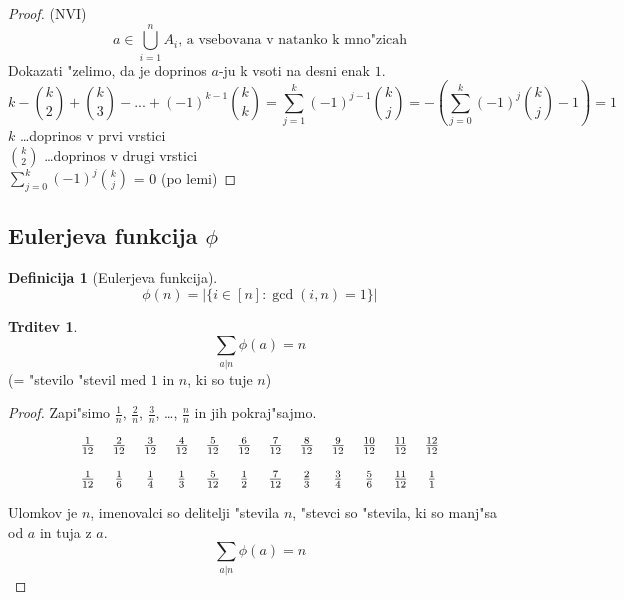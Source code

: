 \documentclass[a4paper,12pt]{article}
\theoremstyle{definition}
\newtheorem{defn}[counter]{Definicija}
\newtheorem{claim}[counter]{Trditev}
\theoremstyle{remark}
\begin{document}
\begin{proof}(NVI)
	\label{TODO: tega ne bom gledu}
	\[a \in \bigcup_{i = 1}^{n} A_i \text{, a vsebovana v natanko k mno"zicah}\]
	Dokazati "zelimo, da je doprinos $a$-ju k vsoti na desni enak $1$.
	\[k - \binom{k}{2} + \binom{k}{3} - ... + (-1)^{k-1} \binom{k}{k} = \sum_{j = 1}^{k} (-1)^{j - 1} \binom{k}{j} = - (\sum_{j = 0}^{k} (-1)^j \binom{k}{j} - 1) = 1\]
	$k$ \ldots doprinos v prvi vrstici\\
	$\binom{k}{2}$ \ldots doprinos v drugi vrstici\\
	$\displaystyle \sum_{j = 0}^{k} (-1)^j \binom{k}{j}$ = 0 (po lemi)
\end{proof}

\subsection{Eulerjeva funkcija $\phi$} %
\begin{defn}[Eulerjeva funkcija]
	\[\phi (n) = |\{i \in [n] : \gcd(i, n) = 1\}|\]
\end{defn}

\begin{claim}
	\[\sum_{a | n} \phi (a) = n\]
	(= "stevilo "stevil med $1$ in $n$, ki so tuje $n$)
\end{claim}

\begin{proof}
	Zapi"simo $\frac{1}{n}$, $\frac{2}{n}$, $\frac{3}{n}$, \ldots, $\frac{n}{n}$ in jih pokraj"sajmo.
	
	\[
	\begin{tabular}{c c c c c c c c c c c c}
	
	$\frac{1}{12}$ & $\frac{2}{12}$ & $\frac{3}{12}$ & $\frac{4}{12}$ & $\frac{5}{12}$ & $\frac{6}{12}$ & $\frac{7}{12}$ & $\frac{8}{12}$ & $\frac{9}{12}$ & $\frac{10}{12}$ & $\frac{11}{12}$ & $\frac{12}{12}$\\
	\\
	$\frac{1}{12}$ & $\frac{1}{6}$ & $\frac{1}{4}$ & $\frac{1}{3}$ & $\frac{5}{12}$ & $\frac{1}{2}$ & $\frac{7}{12}$ & $\frac{2}{3}$ & $\frac{3}{4}$ & $\frac{5}{6}$ & $\frac{11}{12}$ & $\frac{1}{1}$
	
	\end{tabular}
	\]
	
	Ulomkov je $n$, imenovalci so delitelji "stevila $n$, "stevci so "stevila, ki so manj"sa od $a$ in tuja z $a$.
	\[\sum_{a | n} \phi (a) = n\]
\end{proof}
\end{document}
